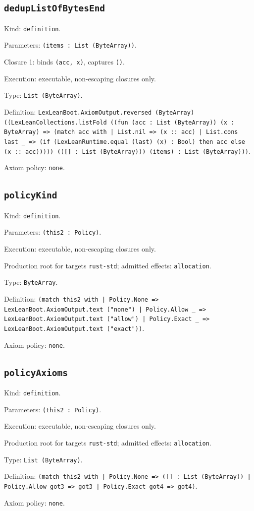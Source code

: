 \documentclass[11pt]{article}
\begin{document}
\subsection*{\texttt{dedupListOfBytesEnd}}
\noindent Kind: \texttt{definition}.\par
\noindent Parameters: \texttt{(items : List (ByteArray))}.\par
\noindent Closure 1: binds \texttt{(acc, x)}, captures \texttt{()}.\par
\noindent Execution: executable, non-escaping closures only.\par
\noindent Type: \texttt{List (ByteArray)}.\par
\noindent Definition: \texttt{LexLeanBoot.AxiomOutput.reversed (ByteArray) ((LexLeanCollections.listFold ((fun (acc : List (ByteArray)) (x : ByteArray) => (match acc with | List.nil => (x :: acc) | List.cons last \_ => (if (LexLeanRuntime.equal (last) (x) : Bool) then acc else (x :: acc))))) (([] : List (ByteArray))) (items) : List (ByteArray)))}.\par
\noindent Axiom policy: \texttt{none}.\par
\subsection*{\texttt{policyKind}}
\noindent Kind: \texttt{definition}.\par
\noindent Parameters: \texttt{(this2 : Policy)}.\par
\noindent Execution: executable, non-escaping closures only.\par
\noindent Production root for targets \texttt{rust-std}; admitted effects: \texttt{allocation}.\par
\noindent Type: \texttt{ByteArray}.\par
\noindent Definition: \texttt{(match this2 with | Policy.None => LexLeanBoot.AxiomOutput.text ("none") | Policy.Allow \_ => LexLeanBoot.AxiomOutput.text ("allow") | Policy.Exact \_ => LexLeanBoot.AxiomOutput.text ("exact"))}.\par
\noindent Axiom policy: \texttt{none}.\par
\subsection*{\texttt{policyAxioms}}
\noindent Kind: \texttt{definition}.\par
\noindent Parameters: \texttt{(this2 : Policy)}.\par
\noindent Execution: executable, non-escaping closures only.\par
\noindent Production root for targets \texttt{rust-std}; admitted effects: \texttt{allocation}.\par
\noindent Type: \texttt{List (ByteArray)}.\par
\noindent Definition: \texttt{(match this2 with | Policy.None => ([] : List (ByteArray)) | Policy.Allow got3 => got3 | Policy.Exact got4 => got4)}.\par
\noindent Axiom policy: \texttt{none}.\par
\end{document}

